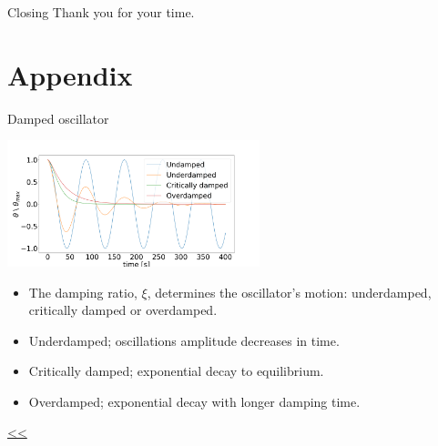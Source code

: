 \documentclass{beamer}
\begin{document}
\begin{frame}{Closing}
	\centering
	Thank you for your time. \\[12pt]
	
\end{frame}






\section{Appendix}

\begin{frame}{\hypertarget{frame:Damped oscillator}{Damped oscillator}}

	\begin{center}		
		\includegraphics[width=0.55\textwidth,keepaspectratio]{damp.png}
    \end{center}
	\begin{itemize}	
		\item The damping ratio, $\xi$, determines the oscillator's motion: underdamped, critically damped or overdamped.
		\item Underdamped; oscillations amplitude decreases in time.
		\item Critically damped; exponential decay to equilibrium.
		\item Overdamped; exponential decay with longer damping time. 		
	\end{itemize}
	\hyperlink{frame:Harmonic oscillator}{<<} 
\end{frame}
\end{document}
